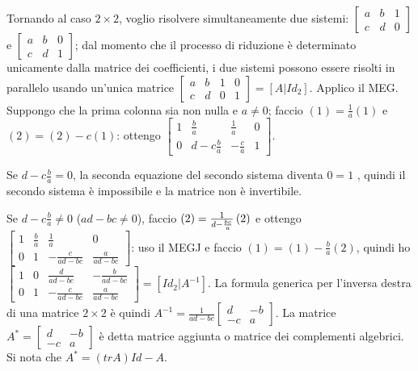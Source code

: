 \documentclass{article}
\begin{document}
Tornando al caso $2\times 2$, voglio risolvere simultaneamente due sistemi: $%
\left[ 
\begin{array}{ccc}
a & b & 1 \\ 
c & d & 0%
\end{array}%
\right] $ e $\left[ 
\begin{array}{ccc}
a & b & 0 \\ 
c & d & 1%
\end{array}%
\right] $; dal momento che il processo di riduzione \`{e} determinato
unicamente dalla matrice dei coefficienti, i due sistemi possono essere
risolti in parallelo usando un'unica matrice $\left[ 
\begin{array}{cccc}
a & b & 1 & 0 \\ 
c & d & 0 & 1%
\end{array}%
\right] =\left[ A|Id_{2}\right] $. Applico il MEG. Suppongo che la prima
colonna sia non nulla e $a\neq 0$; faccio $\left( 1\right) =\frac{1}{a}%
\left( 1\right) $ e $\left( 2\right) =\left( 2\right) -c\left( 1\right) $:
ottengo $\left[ 
\begin{array}{cccc}
1 & \frac{b}{a} & \frac{1}{a} & 0 \\ 
0 & d-c\frac{b}{a} & -\frac{c}{a} & 1%
\end{array}%
\right] $.

Se $d-c\frac{b}{a}=0$, la seconda equazione del secondo sistema diventa $0=1$%
, quindi il secondo sistema \`{e} impossibile e la matrice non \`{e}
invertibile.

Se $d-c\frac{b}{a}\neq 0$ ($ad-bc\neq 0$), faccio $\left( 2\right) =\frac{1}{%
d-\frac{bc}{a}}\left( 2\right) $ e ottengo $\left[ 
\begin{array}{cccc}
1 & \frac{b}{a} & \frac{1}{a} & 0 \\ 
0 & 1 & -\frac{c}{ad-bc} & \frac{a}{ad-bc}%
\end{array}%
\right] $: uso il MEGJ e faccio $\left( 1\right) =\left( 1\right) -\frac{b}{a%
}\left( 2\right) $, quindi ho $\left[ 
\begin{array}{cccc}
1 & 0 & \frac{d}{ad-bc} & -\frac{b}{ad-bc} \\ 
0 & 1 & -\frac{c}{ad-bc} & \frac{a}{ad-bc}%
\end{array}%
\right] =\left[ Id_{2}|A^{-1}\right] $. La formula generica per l'inversa
destra di una matrice $2\times 2$ \`{e} quindi $A^{-1}=\frac{1}{ad-bc}\left[ 
\begin{array}{cc}
d & -b \\ 
-c & a%
\end{array}%
\right] $. La matrice $A^{\ast }=\left[ 
\begin{array}{cc}
d & -b \\ 
-c & a%
\end{array}%
\right] $ \`{e} detta matrice aggiunta o matrice dei complementi algebrici.
Si nota che $A^{\ast }=\left( trA\right) Id-A$.
\end{document}
